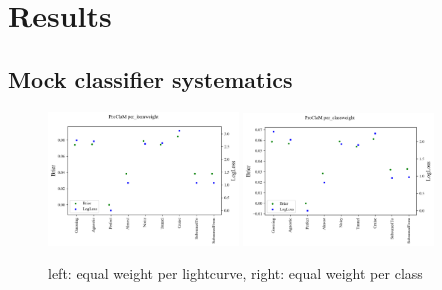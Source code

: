 \section{Results}
\label{sec:results}



\subsection{Mock classifier systematics}
\label{sec:mockresults}

\begin{figure}
	\begin{center}
		\includegraphics[width=0.45\textwidth]{./fig/multi_metric_per_item.png}
		\includegraphics[width=0.45\textwidth]{./fig/multi_metric_per_class.png}
		\caption{left: equal weight per lightcurve, right: equal weight per class}
		\label{fig:fig:plasticc_per_item_vs_class}
	\end{center}
\end{figure}

